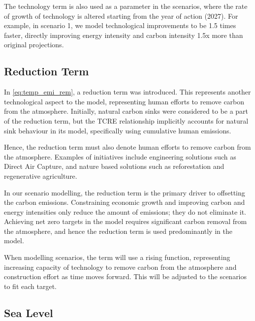 \documentclass[12pt]{article}
\begin{document}
The technology term is also used as a parameter in the scenarios,
where the rate of growth of technology is altered starting from the year of action (2027).
For example, in scenario 1, we model technological improvements to be 1.5 times faster,
directly improving energy intensity and carbon intensity 1.5x more than original projections.


\subsection{Reduction Term}

In \autoref{eq:temp_emi_rem}, a reduction term was introduced.
This represents another technological aspect to the model, representing human efforts to remove carbon from the atmosphere.
Initially, natural carbon sinks were considered to be a part of the reduction term, but the TCRE relationship\supercite{matthews_2009}
implicitly accounts for natural sink behaviour in its model, specifically using cumulative human emissions.

Hence, the reduction term must also denote human efforts to remove carbon from the atmosphere.
Examples of initiatives include engineering solutions such as Direct Air Capture,
and nature based solutions such as reforestation and regenerative agriculture.

In our scenario modelling, the reduction term is the primary driver to offsetting the carbon emissions.
Constraining economic growth and improving carbon and energy intensities only reduce the amount of emissions; they do not eliminate it.
Achieving net zero targets in the model requires significant carbon removal from the atmosphere,
and hence the reduction term is used predominantly in the model.

When modelling scenarios, the term will use a rising function, representing increasing capacity of technology to remove carbon from the atmosphere
and construction effort as time moves forward.
This will be adjusted to the scenarios to fit each target.


\subsection{Sea Level}
\end{document}
